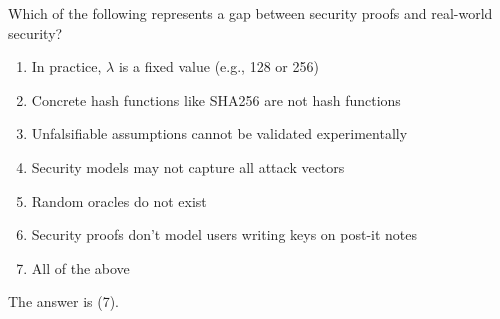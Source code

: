 \begin{exercise}
  Which of the following represents a gap between security proofs and real-world security?
  \begin{enumerate}
    \item In practice, $\lambda$ is a fixed value (e.g., 128 or 256)
    \item Concrete hash functions like SHA256 are not hash functions
    \item Unfalsifiable assumptions cannot be validated experimentally
    \item Security models may not capture all attack vectors
    \item Random oracles do not exist
    \item Security proofs don't model users writing keys on post-it notes
    \item All of the above
  \end{enumerate}
\end{exercise}

\ifsolutions
\begin{mysolution}
  The answer is (7).
\end{mysolution}
\fi
